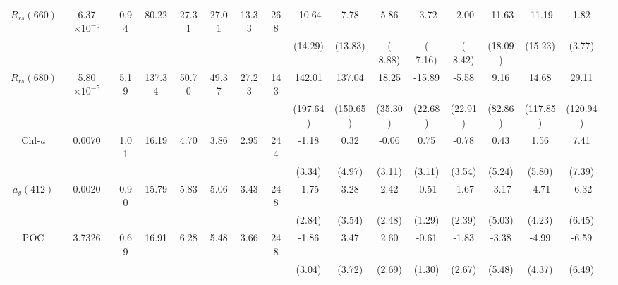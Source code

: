 \documentclass[preview]{standalone}
\begin{document}
\begin{tabular}{ccccccccccccccccc}
$R_{rs}(660)$ 	& 6.37$\times10^{-5}$ 	& 0.94 	&  80.22 	&  27.31 	&	27.01 	&  13.33 	& 	268 	& -10.64  	& 7.78   	&  5.86 	&  -3.72 	& -2.00   	& -11.63    &-11.19    	&  1.82    	\\
 				&						&		&			&			&			&			&			& (14.29) 	& (13.83) 	& ( 8.88) 	& ( 7.16) 	& ( 8.42) 	& (18.09) 	& (15.23) 	&  (3.77) 	\\ \hline 
$R_{rs}(680)$ 	& 5.80$\times10^{-5}$ 	& 5.19 	& 137.34 	&  50.70 	&	49.37 	&  27.23 	& 	143 	&  142.01  	& 137.04  	& 18.25  	& -15.89  	& -5.58   	&   9.16    & 14.68    	& 29.11   	\\
 				&						&		&			&			&			&			&			& (197.64) 	& (150.65) 	&  (35.30)  &  (22.68)  &  (22.91)  &  (82.86)  & (117.85) 	& (120.94) 	\\ \hline
Chl-\it{a} 		&  0.0070             	& 1.01 	&  16.19    &    4.70 	&	 3.86 	&   2.95 	& 	244 	& -1.18  	&    0.32  	&   -0.06   &    0.75  	&   -0.78  	&    0.43  	&    1.56  	&    7.41  	\\
 				&						&		&			&			&			&			&			& (3.34) 	& (4.97) 	& (3.11) 	& (3.11) 	& (3.54) 	& (5.24) 	& (5.80) 	& (7.39) 	\\ \hline
$a_{g}(412)$ 	&  0.0020             	& 0.90 	&  15.79    &    5.83 	&	 5.06 	&   3.43 	& 	248 	& -1.75  	&    3.28  	&    2.42  	&   -0.51  	&   -1.67  	&   -3.17  	&   -4.71  	&   -6.32  	\\
 				&						&		&			&			&			&			&			& (2.84) 	& (3.54) 	& (2.48) 	& (1.29) 	& (2.39) 	& (5.03) 	& (4.23) 	& (6.45) 	\\ \hline
POC 			&  3.7326             	& 0.69 	&  16.91    &    6.28 	&	 5.48 	&   3.66 	& 	248 	& -1.86  	&    3.47  	&    2.60  	&   -0.61  	&   -1.83  	&   -3.38  	&   -4.99  	&   -6.59  	\\
 				&						&		&			&			&			&			&			& (3.04) 	& (3.72) 	& (2.69) 	& (1.30) 	& (2.67) 	& (5.48) 	& (4.37) 	& (6.49) 	\\ \hline
 \end{tabular}
\end{document}
